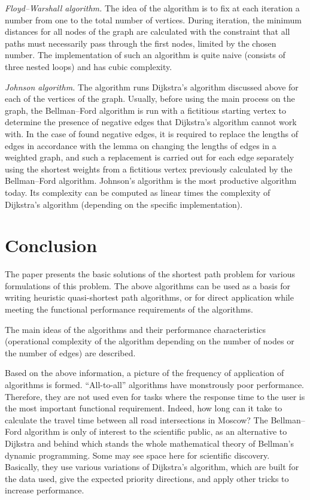     \textit{Floyd--Warshall algorithm.}
    The idea of the algorithm is to fix at each iteration a number from one to the total number of vertices.
    During iteration, the minimum distances for all nodes of the graph are calculated with the constraint that all paths must necessarily pass through the first nodes, limited by the chosen number.
    The implementation of such an algorithm is quite naive (consists of three nested loops) and has cubic complexity.
    
    \textit{Johnson algorithm.}
    The algorithm runs Dijkstra's algorithm discussed above for each of the vertices of the graph.
    Usually, before using the main process on the graph, the Bellman--Ford algorithm is run with a fictitious starting vertex to determine the presence of negative edges that Dijkstra's algorithm cannot work with.
    In the case of found negative edges, it is required to replace the lengths of edges in accordance with the lemma on changing the lengths of edges in a weighted graph, and such a replacement is carried out for each edge separately using the shortest weights from a fictitious vertex previously calculated by the Bellman--Ford algorithm.
    Johnson's algorithm is the most productive algorithm today.
    Its complexity can be computed as linear times the complexity of Dijkstra's algorithm (depending on the specific implementation).
    
    
    \section{Conclusion}
    The paper presents the basic solutions of the shortest path problem for various formulations of this problem.
    The above algorithms can be used as a basis for writing heuristic quasi-shortest path algorithms, or for direct application while meeting the functional performance requirements of the algorithms.

    The main ideas of the algorithms and their performance characteristics (operational complexity of the algorithm depending on the number of nodes or the number of edges) are described.
    
    Based on the above information, a picture of the frequency of application of algorithms is formed.
    ``All-to-all'' algorithms have monstrously poor performance.
    Therefore, they are not used even for tasks where the response time to the user is the most important functional requirement.
    Indeed, how long can it take to calculate the travel time between all road intersections in Moscow?
    The Bellman--Ford algorithm is only of interest to the scientific public, as an alternative to Dijkstra and behind which stands the whole mathematical theory of Bellman's dynamic programming.
    Some may see space here for scientific discovery.
    Basically, they use various variations of Dijkstra's algorithm, which are built for the data used, give the expected priority directions, and apply other tricks to increase performance.

